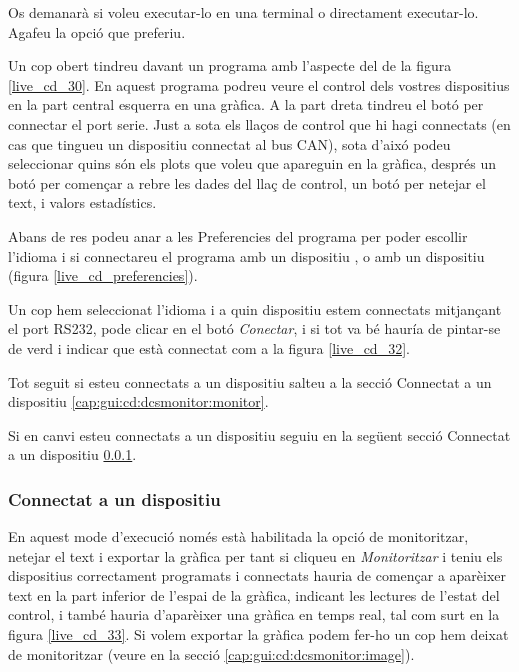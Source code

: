 Os demanarà si voleu executar-lo en una terminal o directament executar-lo. Agafeu la opció que preferiu.

Un cop obert tindreu davant un programa amb l'aspecte del de la figura \ref{live_cd_30}. En aquest programa podreu veure el control dels vostres dispositius en la part central esquerra en una gràfica. A la part dreta tindreu el botó per connectar el port serie. Just a sota els llaços de control que hi hagi connectats (en cas que tingueu un dispositiu \Monitor connectat al bus CAN), sota d'aixó podeu seleccionar quins són els plots que voleu que apareguin en la gràfica, després un botó per començar a rebre les dades del llaç de control, un botó per netejar el text, i valors estadístics.


Abans de res podeu anar a les Preferencies del programa per poder escollir l'idioma i si connectareu el programa amb un dispositiu \Monitor, o amb un dispositiu \SensorActuador (figura \ref{live_cd_preferencies}).


Un cop hem seleccionat l'idioma i a quin dispositiu estem connectats mitjançant el port RS232, pode clicar en el botó \emph{Conectar}, i si tot va bé hauría de pintar-se de verd i indicar que està connectat com a la figura \ref{live_cd_32}.


Tot seguit si esteu connectats a un dispositiu \Monitor salteu a la secció Connectat a un dispositiu \Monitor \ref{cap:gui:cd:dcsmonitor:monitor}.

Si en canvi esteu connectats a un dispositiu \SensorActuador seguiu en la següent secció Connectat a un dispositiu \SensorActuador \ref{cap:gui:cd:dcsmonitor:sensor}.

\subsubsection{Connectat a un dispositiu \SensorActuador}\label{cap:gui:cd:dcsmonitor:sensor}

En aquest mode d'execució només està habilitada la opció de monitoritzar, netejar el text i exportar la gràfica per tant si cliqueu en \emph{Monitoritzar} i teniu els dispositius correctament programats i connectats hauria de començar a aparèixer text en la part inferior de l'espai de la gràfica, indicant les lectures de l'estat del control, i també hauria d'aparèixer una gràfica en temps real, tal com surt en la figura \ref{live_cd_33}.
Si volem exportar la gràfica podem fer-ho un cop hem deixat de monitoritzar (veure en la secció \ref{cap:gui:cd:dcsmonitor:image}).

